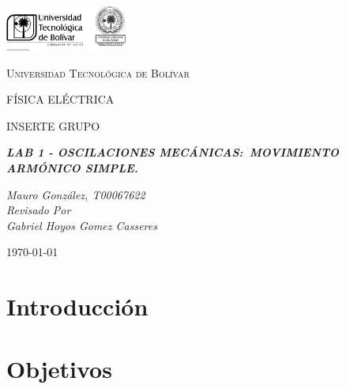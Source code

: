 \documentclass[twocolumn, 12pt]{article}
\begin{document}
\begin{titlepage}
    \centering
    \includegraphics[width=0.3\textwidth]{Images/logo_utb.png}\par\vspace{1cm}
    {\scshape\LARGE Universidad Tecnológica de Bolívar \par}
    \vspace{1cm}

    {\scshape\Large FÍSICA ELÉCTRICA \par}
    \vspace{.2cm}

    {\scshape\Large INSERTE GRUPO \par}
    \vspace{1cm}
    \slshape {\Large \bfseries{}LAB 1 - OSCILACIONES MECÁNICAS:\@{}~MOVIMIENTO ARMÓNICO SIMPLE.\\}
    \vspace{4cm}

    \slshape {\itshape{} Mauro González, T00067622 \\}
    \vfill
    Revisado Por \\
    Gabriel Hoyos Gomez Casseres\\
    {\large \today\par}
\end{titlepage}

\section{Introducción}

\section{Objetivos}
\end{document}
